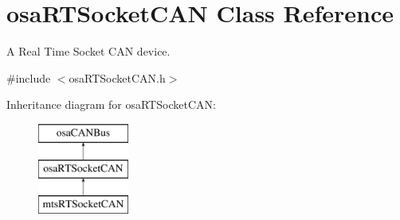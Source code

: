 \hypertarget{classosa_r_t_socket_c_a_n}{\section{osa\-R\-T\-Socket\-C\-A\-N Class Reference}
\label{classosa_r_t_socket_c_a_n}
}


A Real Time Socket C\-A\-N device.  




{\ttfamily \#include $<$osa\-R\-T\-Socket\-C\-A\-N.\-h$>$}

Inheritance diagram for osa\-R\-T\-Socket\-C\-A\-N\-:\begin{figure}[H]
\begin{center}
\leavevmode
\includegraphics[height=3.000000cm]{d6/d60/classosa_r_t_socket_c_a_n}
\end{center}
\end{figure}
